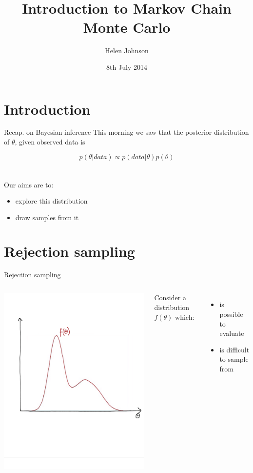 \documentclass[compress]{beamer}
\title{Introduction to Markov Chain Monte Carlo}
\author{Helen Johnson}
\date{8th July 2014}
\begin{document}
\begin{frame}
\titlepage
\end{frame}

\section{Introduction}
\label{sec-5}
\begin{frame}[label=sec-5-1]{Recap. on Bayesian inference}
This morning we saw that the posterior distribution of $\theta$, given observed data is

$$ p(\theta | data) \propto p(data |\theta) p(\theta)$$\\~\\

Our aims are to:
\begin{itemize}
\item explore this distribution
\item draw samples from it
\end{itemize}
\end{frame}

\section{Rejection sampling}
\label{sec-6}
\begin{frame}[label=sec-5-2]{Rejection sampling}
\begin{columns}[c] 
\includegraphics[width=.8\linewidth]{RS1.png}

Consider a distribution $f(\theta)$ which:
\begin{itemize}
\item is possible to evaluate
\item is difficult to sample from
\end{itemize}
\end{columns}
\end{frame}
\end{document}
